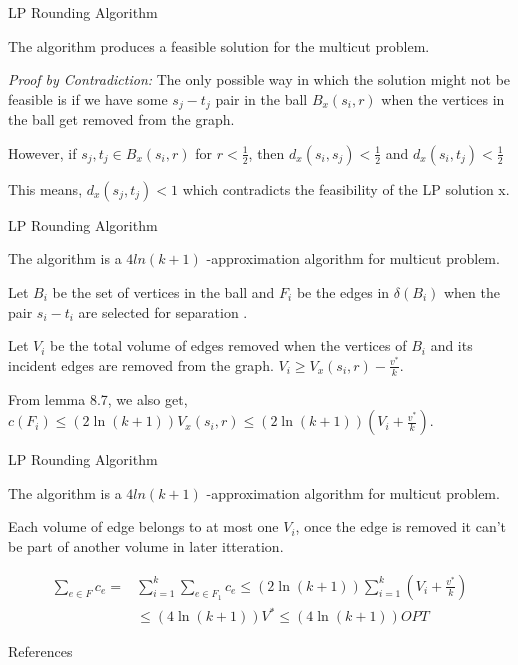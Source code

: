 \documentclass{beamer}
\begin{document}
\begin{frame}{LP Rounding Algorithm}

\begin{lemma}[8.8]
    The algorithm produces a feasible solution for the multicut problem. 
\end{lemma}

\vspace{10pt}

\textit{Proof by Contradiction:} 
The only possible way in which the solution might not be feasible is if we have some $s_j - t_j$ pair in the ball $B_x(s_i , r)$ when the vertices in the ball get removed
from the graph.\newline

However, if $s_j , t_j \in B_x(s_i , r) $ for $r < \frac{1}{2}$, then $d_x(s_i , s_j ) < \frac{1}{2}$ and
$d_x(s_i , t_j ) < \frac{1}{2}$ \newline

This means, $d_x (s_j , t_j ) < 1$ which contradicts the feasibility of the LP solution x. 
    
\end{frame}

\begin{frame}{LP Rounding Algorithm}

\begin{theorem}
    The algorithm is a $4ln(k+1)$ -approximation algorithm for multicut problem. 
\end{theorem}

\vspace{10pt}

Let $B_i$ be the set of vertices in the ball and $F_i$ be the edges in $\delta(B_i)$ when the pair $s_i - t_i$ are selected for separation .

Let $V_i$ be the total volume of edges removed when the vertices of $B_i$ and its incident edges are removed from the graph.  $V_i \geq V_x(s_i, r) - \frac{v^*}{k} $.

From lemma 8.7, we also get, $c(F_i) \leq (2 \ln(k + 1)) V_x(s_i, r) \leq (2 \ln(k + 1))( V_i + \frac{v^*}{k} )$.

\end{frame}

\begin{frame}{LP Rounding Algorithm}

\begin{theorem}
    The algorithm is a $4ln(k+1)$ -approximation algorithm for multicut problem. 
\end{theorem}

\vspace{10pt}

Each volume of edge belongs to at most one $V_i$, once the edge is removed it can't be part of another volume in later itteration. 

\begin{align*}
    \sum_{e \in F} c_e = & \sum_{i=1}^k \sum_{e \in F_1} c_e \leq (2 \ln(k + 1)) \sum_{i=1}^k( V_i + \frac{v^*}{k} ) \\
    & \leq (4 \ln(k + 1)) V^* \leq (4 \ln(k + 1)) OPT
\end{align*}

\end{frame}

\begin{frame}{References}
    \printbibliography[heading=bibintoc,title={Whole bibliography}]
\end{frame}
\end{document}
